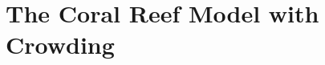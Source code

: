 \documentclass[reqno,11pt]{amsart}
\numberwithin{equation}{section}
\newcommand{\mg}[1]{{\color{magenta}#1}}
\begin{document}

\bigskip


\section{The Coral Reef Model with Crowding}\label{sec:model}
\end{document}
